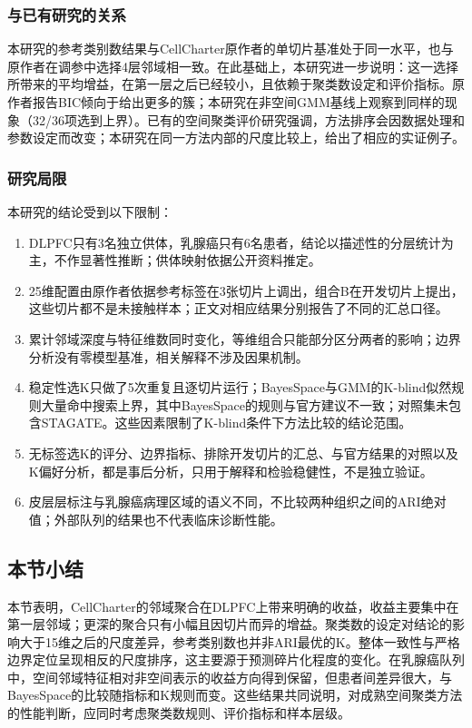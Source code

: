 \subsubsection{与已有研究的关系}
本研究的参考类别数结果与CellCharter原作者的单切片基准处于同一水平，也与原作者在调参中选择4层邻域相一致\cite{varrone2024}。在此基础上，本研究进一步说明：这一选择所带来的平均增益，在第一层之后已经较小，且依赖于聚类数设定和评价指标。原作者报告BIC倾向于给出更多的簇；本研究在非空间GMM基线上观察到同样的现象（32/36项选到上界）。已有的空间聚类评价研究强调，方法排序会因数据处理和参数设定而改变\cite{sun2026}；本研究在同一方法内部的尺度比较上，给出了相应的实证例子。

\subsubsection{研究局限}
\label{subsubsec:cc-limits-p1}
本研究的结论受到以下限制：
\begin{enumerate}
  \item DLPFC只有3名独立供体，乳腺癌只有6名患者，结论以描述性的分层统计为主，不作显著性推断；供体映射依据公开资料推定。
  \item 25维配置由原作者依据参考标签在3张切片上调出，组合B在开发切片上提出，这些切片都不是未接触样本；正文对相应结果分别报告了不同的汇总口径。
  \item 累计邻域深度与特征维数同时变化，等维组合只能部分区分两者的影响；边界分析没有零模型基准，相关解释不涉及因果机制。
  \item 稳定性选K只做了5次重复且逐切片运行；BayesSpace与GMM的K-blind似然规则大量命中搜索上界，其中BayesSpace的规则与官方建议不一致；对照集未包含STAGATE。这些因素限制了K-blind条件下方法比较的结论范围。
  \item 无标签选K的评分、边界指标、排除开发切片的汇总、与官方结果的对照以及K偏好分析，都是事后分析，只用于解释和检验稳健性，不是独立验证。
  \item 皮层层标注与乳腺癌病理区域的语义不同，不比较两种组织之间的ARI绝对值；外部队列的结果也不代表临床诊断性能。
\end{enumerate}

\subsection{本节小结}
本节表明，CellCharter的邻域聚合在DLPFC上带来明确的收益，收益主要集中在第一层邻域；更深的聚合只有小幅且因切片而异的增益。聚类数的设定对结论的影响大于15维之后的尺度差异，参考类别数也并非ARI最优的K。整体一致性与严格边界定位呈现相反的尺度排序，这主要源于预测碎片化程度的变化。在乳腺癌队列中，空间邻域特征相对非空间表示的收益方向得到保留，但患者间差异很大，与BayesSpace的比较随指标和K规则而变。这些结果共同说明，对成熟空间聚类方法的性能判断，应同时考虑聚类数规则、评价指标和样本层级。

